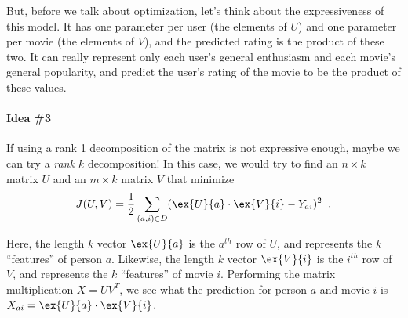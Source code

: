 But, before we talk about optimization, let's think about the
expressiveness of this model.  It has one parameter per user (the
elements of $U$) and one parameter per movie (the elements of $V$),
and the predicted rating is the product of these two.  It can really
represent only each user's general enthusiasm and each movie's general
popularity, and predict the user's rating of the movie to be the
product of these values.

\paragraph*{Idea \#3}
If using a rank 1 decomposition of the matrix is not expressive
enough, maybe we can try a {\em rank $k$} decomposition!   In this
case, we would try to find an  $n\times k$
matrix $U$ and an $m \times k$ matrix $V$ that minimize
\[J(U,V) = \frac{1}{2} \sum_{(a,i)\in D} (\ex{U}{a} \cdot \ex{V}{i}
  - Y_{ai})^2\;\;.\]

\begin{center}
\end{center}


Here, the length $k$ vector $\ex{U}{a}$ is the $a^{th}$ row of $U$,
and represents the $k$ ``features'' of person $a$. Likewise, the
length $k$ vector $\ex{V}{i}$ is the $i^{th}$ row of $V$, and
represents the $k$ ``features'' of movie $i$. Performing the matrix
multiplication $X = UV^T$, we see what the prediction for person
$a$ and movie $i$ is $X_{ai} = \ex{U}{a} \cdot \ex{V}{i}$.

